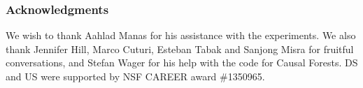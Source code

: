 \documentclass{article}
\begin{document}


\subsubsection*{Acknowledgments}
We wish to thank Aahlad Manas for his assistance with the experiments. We also thank Jennifer Hill, Marco Cuturi, Esteban Tabak and Sanjong Misra for fruitful conversations, and Stefan Wager for his help with the code for Causal Forests. DS and US were supported by NSF CAREER award \#1350965.

{\small


}
\newpage

\appendix




\end{document}
